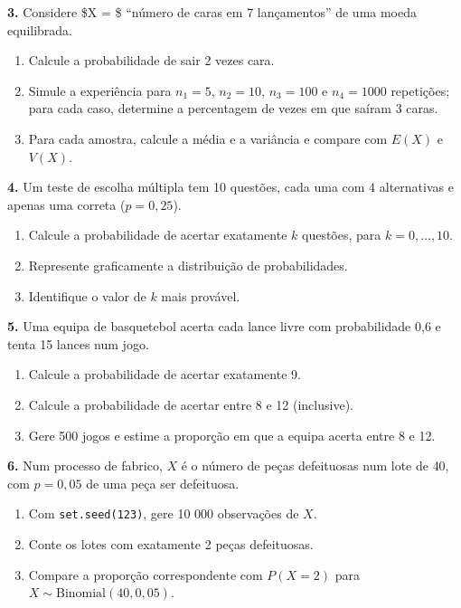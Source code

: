 \documentclass[
  portuguese,
  11pt,
  openany]{book}
\providecommand{\tightlist}{%
  \setlength{\itemsep}{0pt}\setlength{\parskip}{0pt}}
\begin{document}
\textbf{3.} Considere \$X = \$ ``número de caras em 7 lançamentos'' de uma moeda equilibrada.

\begin{enumerate}
\def\labelenumi{(\alph{enumi})}
\tightlist
\item
  Calcule a probabilidade de sair 2 vezes cara.
\item
  Simule a experiência para \(n_1 = 5\), \(n_2 = 10\), \(n_3 = 100\) e \(n_4 = 1000\)
  repetições; para cada caso, determine a percentagem de vezes em que saíram 3 caras.
\item
  Para cada amostra, calcule a média e a variância e compare com \(E(X)\) e \(V(X)\).
\end{enumerate}

\textbf{4.} Um teste de escolha múltipla tem 10 questões, cada uma com 4 alternativas e
apenas uma correta (\(p = 0{,}25\)).

\begin{enumerate}
\def\labelenumi{(\alph{enumi})}
\tightlist
\item
  Calcule a probabilidade de acertar exatamente \(k\) questões, para \(k = 0, \ldots, 10\).
\item
  Represente graficamente a distribuição de probabilidades.
\item
  Identifique o valor de \(k\) mais provável.
\end{enumerate}

\textbf{5.} Uma equipa de basquetebol acerta cada lance livre com probabilidade 0,6 e tenta
15 lances num jogo.

\begin{enumerate}
\def\labelenumi{(\alph{enumi})}
\tightlist
\item
  Calcule a probabilidade de acertar exatamente 9.
\item
  Calcule a probabilidade de acertar entre 8 e 12 (inclusive).
\item
  Gere 500 jogos e estime a proporção em que a equipa acerta entre 8 e 12.
\end{enumerate}

\textbf{6.} Num processo de fabrico, \(X\) é o número de peças defeituosas num lote de 40, com
\(p = 0{,}05\) de uma peça ser defeituosa.

\begin{enumerate}
\def\labelenumi{(\alph{enumi})}
\tightlist
\item
  Com \texttt{set.seed(123)}, gere 10 000 observações de \(X\).
\item
  Conte os lotes com exatamente 2 peças defeituosas.
\item
  Compare a proporção correspondente com \(P(X = 2)\) para \(X \sim \text{Binomial}(40, 0{,}05)\).
\end{enumerate}
\end{document}
